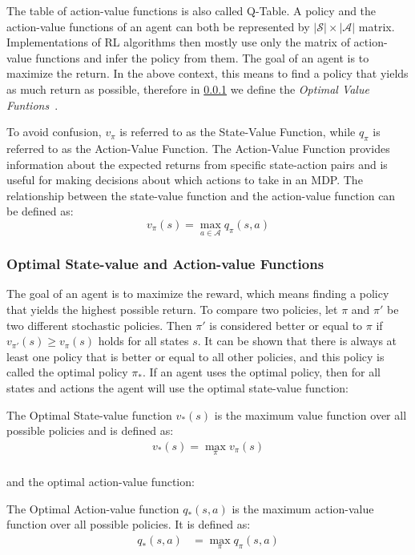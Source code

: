\documentclass[../xlapes02]{subfiles}
\begin{document}
    The table of action-value functions is also called Q-Table. A policy and the action-value functions of an agent can both be represented by $|\mathcal{S}|\times|\mathcal{A}|$ matrix. Implementations of RL algorithms then mostly use only the matrix of action-value functions and infer the policy from them. The goal of an agent is to maximize the return. In the above context, this means to find a policy that yields as much return as possible, therefore in \cref{subsubsec:optimal-value-functions} we define the \emph{Optimal Value Funtions}~\cite{sutton2018reinforcement}.

    To avoid confusion, $v_\pi$ is referred to as the State-Value Function, while $q_\pi$ is referred to as the Action-Value Function. The Action-Value Function provides information about the expected returns from specific state-action pairs and is useful for making decisions about which actions to take in an MDP. The relationship between the state-value function and the action-value function can be defined as:
    \begin{equation}
        v_\pi(s) = \max_{a\in\mathcal{A}} q_\pi(s, a)
    \end{equation}

    \subsubsection{Optimal State-value and Action-value Functions}\label{subsubsec:optimal-value-functions}
    The goal of an agent is to maximize the reward, which means finding a policy that yields the highest possible return. To compare two policies, let $\pi$ and $\pi'$ be two different stochastic policies. Then $\pi'$ is considered better or equal to $\pi$ if $v_{\pi'}(s) \geq v_{\pi}(s)$ holds for all states $s$. It can be shown that there is always at least one policy that is better or equal to all other policies, and this policy is called the optimal policy $\pi_*$. If an agent uses the optimal policy, then for all states and actions the agent will use the optimal state-value function:
    \begin{definition}
        The Optimal State-value function $v_*(s)$ is the maximum value function over all possible policies and is defined as:
        \begin{equation}
            \begin{split}
                v_*(s)=\max_{\pi}v_{\pi}(s)\\
            \end{split}
        \end{equation}
    \end{definition}
    and the optimal action-value function:
    \begin{definition}
        The Optimal Action-value function $q_*(s, a)$ is the maximum action-value function over all possible policies. It is defined as:
        \begin{equation}
            \begin{split}
                q_*(s,a)&=\max_{\pi}q_{\pi}(s,a)\\
            \end{split}
        \end{equation}
    \end{definition}
\end{document}
